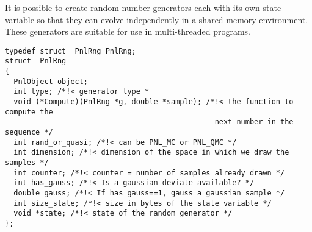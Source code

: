 It is possible to create random number generators each with its own state
variable so that they can evolve independently in a shared memory environment.
These generators are suitable for use in multi-threaded programs. 

\begin{verbatim}
typedef struct _PnlRng PnlRng;
struct _PnlRng
{
  PnlObject object;
  int type; /*!< generator type *
  void (*Compute)(PnlRng *g, double *sample); /*!< the function to compute the
                                                next number in the sequence */
  int rand_or_quasi; /*!< can be PNL_MC or PNL_QMC */
  int dimension; /*!< dimension of the space in which we draw the samples */
  int counter; /*!< counter = number of samples already drawn */
  int has_gauss; /*!< Is a gaussian deviate available? */
  double gauss; /*!< If has_gauss==1, gauss a gaussian sample */
  int size_state; /*!< size in bytes of the state variable */
  void *state; /*!< state of the random generator */
};
\end{verbatim}


